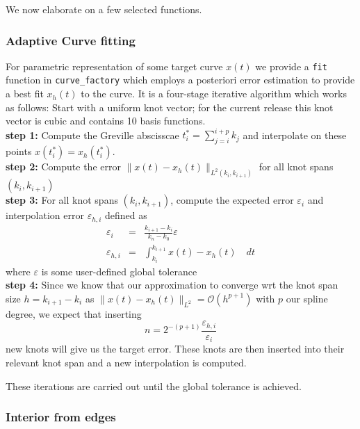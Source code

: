 \documentclass[preprint,12pt, a4paper]{elsarticle}
\begin{document}
We now elaborate on a few selected functions.

\subsubsection{Adaptive Curve fitting}
\label{sec:adaptive-curve-fit}
For parametric representation of some target curve $x(t)$ we provide a \texttt{fit} function in \texttt{curve\_factory} which employs a posteriori error estimation to provide a best fit $x_h(t)$ to the curve.
It is a four-stage iterative algorithm which works as follows:
Start with a uniform knot vector; for the current release this knot vector is cubic and contains 10  basis functions.
\\ \textbf{step 1:}
Compute the Greville abscisscae $t^*_i = \sum_{j=i}^{i+p} k_j$ and interpolate on these points $x(t_i^*) = x_h(t_i^*)$.
\\ \textbf{step 2:}
Compute the error $\|x(t)-x_h(t)\|_{L^2(k_i,k_{i+1})}$ for all knot spans $(k_i,k_{i+1})$
\\ \textbf{step 3:}
For all knot spans $(k_i,k_{i+1})$, compute the expected error $\varepsilon_i$ and interpolation error $\varepsilon_{h,i}$ defined as
\begin{eqnarray}
    \varepsilon_i     & = & \frac{k_{i+1} - k_i}{k_n - k_0}\varepsilon \\
    \varepsilon_{h,i} & = & \int_{k_i}^{k_{i+1}} x(t) - x_h(t)\quad dt
\end{eqnarray}
where $\varepsilon$ is some user-defined global tolerance
\\ \textbf{step 4:}
Since we know that our approximation \cite{deboor1978apg} to converge wrt the knot span size $h=k_{i+1}-k_i$ as $\|x(t)-x_h(t)\|_{L^2} = \mathcal{O}(h^{p+1})$ with $p$ our spline degree, we expect that inserting
\begin{equation}
    n = 2^{-(p+1)}\frac{\varepsilon_{h,i}}{\varepsilon_i}
\end{equation}
new knots will give us the target error.
These knots are then inserted into their relevant knot span and a new interpolation is computed.

These iterations are carried out until the global tolerance is achieved.

\subsubsection{Interior from edges}
\label{sec:interior-from-edges}
\end{document}
